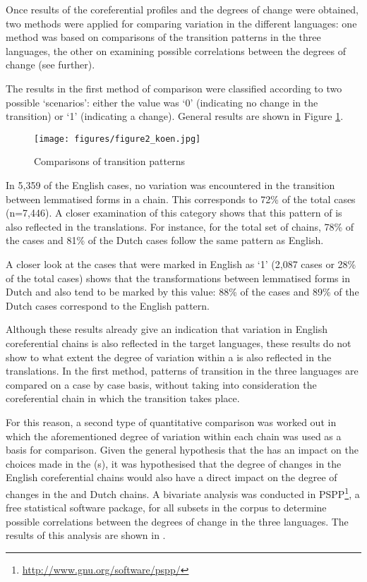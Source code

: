 \documentclass[output=paper]{langsci/langscibook.cls}
\begin{document}
Once results of the coreferential profiles and the degrees of change were obtained, 
two methods were applied for comparing variation in the different languages: one 
method was based on comparisons of the transition patterns in the three languages, 
the other on examining possible correlations between the degrees of change (see 
further). 

The results in the first method of comparison were classified according to two possible 
`scenarios': either the value was `0' (indicating no change in the transition) 
or `1' (indicating a change). General results are shown in Figure \ref{fig:2}.

\begin{figure}
	
\texttt{[image: figures/figure2\_koen.jpg]}

\caption{Comparisons of transition patterns}
\label{fig:2}
\end{figure}

In 5,359 of the English cases, no variation was encountered in the transition between 
lemmatised forms in a chain. This corresponds to 72\% of the total cases (n=7,446). 
A closer examination of this category shows that this pattern of  is 
also reflected in the translations. For instance, for the total set of chains, 
78\% of the  cases and 81\% of the Dutch cases follow the same pattern as 
English. 


A closer look at the cases that were marked in English as `1' (2,087 cases or 28\% 
of the total cases) shows that the transformations between lemmatised forms in 
Dutch and  also tend to be marked by this value: 88\% of the  cases 
and 89\% of the Dutch cases correspond to the English pattern.

Although these results already give an indication that variation in English coreferential 
chains is also reflected in the target languages, these results do not show to 
what extent the degree of variation within a  is also reflected 
in the translations. In the first method, patterns of transition in the three languages 
are compared on a case by case basis, without taking into consideration the coreferential 
chain in which the transition takes place.

For this reason, a second type of quantitative comparison was worked out in which 
the aforementioned degree of variation within each chain was used as a basis for 
comparison. Given the general hypothesis that the  has an impact 
on the choices made in the (s), it was hypothesised that the degree 
of changes in the English coreferential chains would also have a direct impact 
on the degree of changes in the  and Dutch chains. A bivariate analysis was 
conducted in PSPP\footnote{\url{http://www.gnu.org/software/pspp/}}, a free statistical software package, for all subsets in the corpus to determine possible correlations between the degrees of change in the three 
languages. The results of this analysis are shown in .
\end{document}
